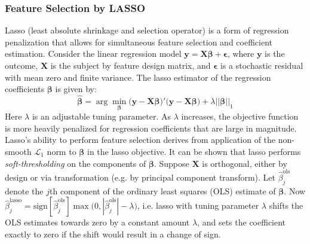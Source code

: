 \documentclass[a4paper]{article}
\begin{document}
\subsubsection{Feature Selection by LASSO}
Lasso (least absolute shrinkage and selection operator) is a form of regression penalization that allows for simultaneous feature selection and coefficient estimation. Consider the linear regression model $\bm{y} = \bm{X}\bm{\beta} + \bm{\epsilon}$, where $\bm{y}$ is the outcome, $\bm{X}$ is the subject by feature design matrix, and $\bm{\epsilon}$ is a stochastic residual with mean zero and finite variance. The lasso estimator of the regression coefficients $\bm{\beta}$ is given by:
\begin{equation}
\bm{\hat{\beta}} = \arg\min_{\bm{\beta}}\big(\bm{y}-\bm{X}\bm{\beta}\big)'\big(\bm{y}-\bm{X}\bm{\beta}\big) + \lambda ||\bm{\beta}||_{1}
\end{equation} 
Here $\lambda$ is an adjustable tuning parameter. As $\lambda$ increases, the objective function is more heavily penalized for regression coefficients that are large in magnitude. Lasso's ability to perform feature selection derives from application of the non-smooth $\mathcal{L}_{1}$ norm to $\bm{\beta}$ in the lasso objective. It can be shown that lasso performs \textit{soft-thresholding} on the components of $\bm{\beta}$. Suppose $\bm{X}$ is orthogonal, either by design or via transformation (e.g. by principal component transform). Let $\hat{\beta}_{j}^{\text{ols}}$ denote the $j$th component of the ordinary least squares (OLS) estimate of $\bm{\beta}$. Now $\hat{\beta}_{j}^{\text{lasso}} = \text{sign}[\hat{\beta}_{j}^{\text{ols}}]\max\big(0,|\hat{\beta}_{j}^{\text{ols}}|-\lambda\big)$, i.e. lasso with tuning parameter $\lambda$ shifts the OLS estimates towards zero by a constant amount $\lambda$, and sets the coefficient exactly to zero if the shift would result in a change of sign. 
\end{document}
